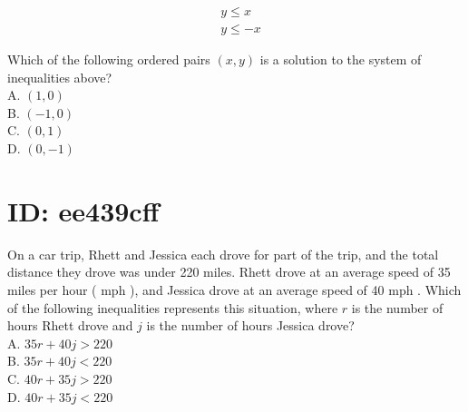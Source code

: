 $$
\begin{aligned}
& y \leq x \\
& y \leq-x
\end{aligned}
$$

Which of the following ordered pairs $(x, y)$ is a solution to the system of inequalities above?\\
A. $(1,0)$\\
B. $(-1,0)$\\
C. $(0,1)$\\
D. $(0,-1)$












\section*{ID: ee439cff}
On a car trip, Rhett and Jessica each drove for part of the trip, and the total distance they drove was under 220 miles. Rhett drove at an average speed of 35 miles per hour ( mph ), and Jessica drove at an average speed of 40 mph . Which of the following inequalities represents this situation, where $r$ is the number of hours Rhett drove and $j$ is the number of hours Jessica drove?\\
A. $35 r+40 j>220$\\
B. $35 r+40 j<220$\\
C. $40 r+35 j>220$\\
D. $40 r+35 j<220$









